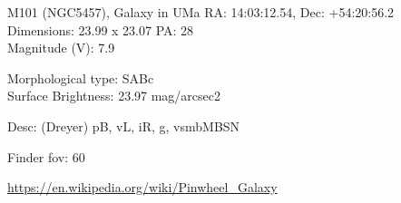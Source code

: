 \begin{block}{M101 (NGC5457), Galaxy in UMa}
    RA: 14:03:12.54, Dec: +54:20:56.2 \\ 
    Dimensions: 23.99 x 23.07 PA: 28 \\ 
    Magnitude (V): 7.9

    Morphological type: SABc \\ 
    Surface Brightness: 23.97 mag/arcsec2 

    Desc: (Dreyer) pB, vL, iR, g, vsmbMBSN 

    Finder fov: 60 

    \url{https://en.wikipedia.org/wiki/Pinwheel_Galaxy} 
\end{block}